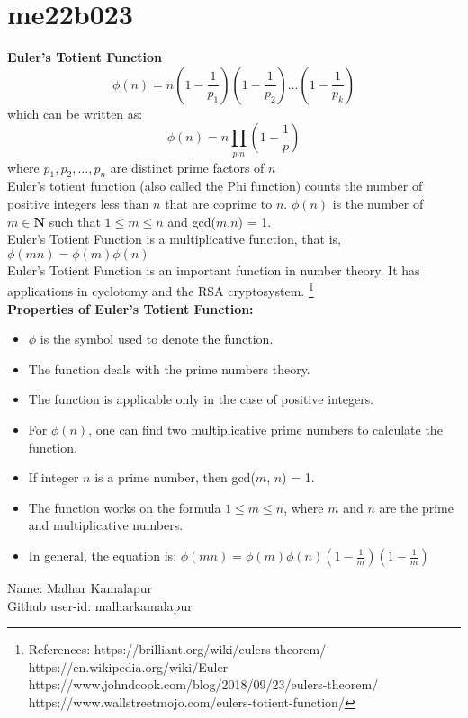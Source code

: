 \section{me22b023}
\textbf{Euler's Totient Function}
\[\phi(n) = n\left(1 - \frac{1}{p_1}\right)\left(1 - \frac{1}{p_2}\right)\ldots\left(1 - \frac{1}{p_k}\right)\]
which can be written as:
\[\phi(n) = n\prod_{p|n}\left(1 - \frac{1}{p}\right)\]
where $p_1,p_2,\ldots,p_n$ are distinct prime factors of $n$ \\
Euler's totient function (also called the Phi function) counts the number of positive integers less than $n$ that are coprime to $n$. $\phi(n)$ is the number of $m \in \mathbf{N}$ such that $1 \le m \le n$ and gcd($m$,$n$) = 1. \\
Euler's Totient Function is a multiplicative function, that is, $\phi(mn) = \phi(m)\phi(n)$ \\
Euler's Totient Function is an important function in number theory. It has applications in cyclotomy and the RSA cryptosystem.
\footnote{
References: 
https://brilliant.org/wiki/eulers-theorem/ \\
https://en.wikipedia.org/wiki/Euler \\
https://www.johndcook.com/blog/2018/09/23/eulers-theorem/ \\
https://www.wallstreetmojo.com/eulers-totient-function/
} \\ 
\textbf{Properties of Euler's Totient Function:}
\begin{itemize}
\item $\phi$ is the symbol used to denote the function.
\item The function deals with the prime numbers theory.
\item The function is applicable only in the case of positive integers.
\item For $\phi(n)$, one can find two multiplicative prime numbers to calculate the function.
\item If integer $n$ is a prime number, then gcd($m$, $n$) = 1.
\item The function works on the formula $1 \le m \le n$, where $m$ and $n$ are the prime and multiplicative numbers.
\item In general, the equation is: 
$\phi(mn) = \phi(m)\phi(n)\left(1 - \frac{1}{m}\right)\left(1 - \frac{1}{m}\right)$

\end{itemize}

Name: Malhar Kamalapur \\
Github user-id: malharkamalapur
